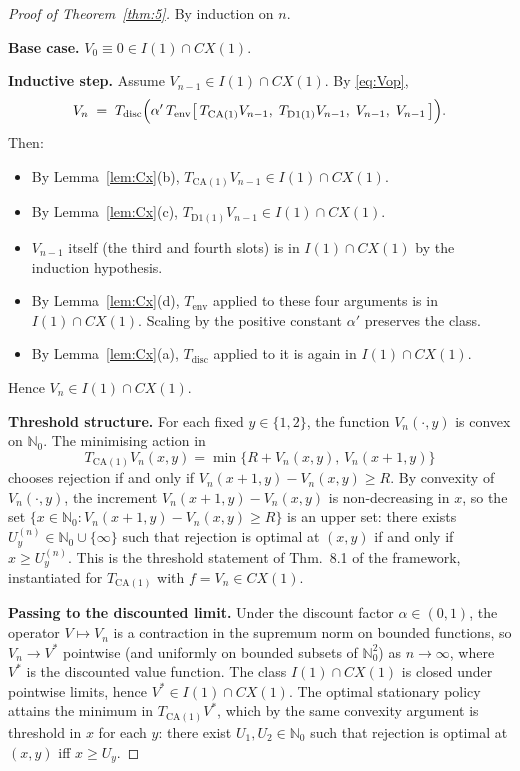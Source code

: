 \documentclass[11pt,a4paper]{article}
\newcommand{\N}{\mathbb{N}}
\newcommand{\Tdisc}{T_{\mathrm{disc}}}
\newcommand{\Tenv}{T_{\mathrm{env}}}
\newcommand{\Tca}{T_{\mathrm{CA}(1)}}
\newcommand{\Td}{T_{\mathrm{D1}(1)}}
\newcommand{\Cx}{CX}
\newcommand{\Iclass}{I}
\theoremstyle{definition}
\begin{document}
\begin{proof}[Proof of Theorem~\ref{thm:5}]
By induction on $n$.

\textbf{Base case.} $V_0 \equiv 0 \in \Iclass(1) \cap \Cx(1)$.

\textbf{Inductive step.} Assume $V_{n-1} \in \Iclass(1) \cap
\Cx(1)$. By \eqref{eq:Vop},
\[
    V_n \;=\; \Tdisc\Bigl(\alpha'\,
        \Tenv\bigl[\,\Tca V_{n-1},\; \Td V_{n-1},\; V_{n-1},\; V_{n-1}\,\bigr]\Bigr).
\]
Then:
\begin{itemize}[leftmargin=2em, itemsep=0pt]
    \item By Lemma~\ref{lem:Cx}(b), $\Tca V_{n-1} \in \Iclass(1)
        \cap \Cx(1)$.
    \item By Lemma~\ref{lem:Cx}(c), $\Td V_{n-1} \in \Iclass(1)
        \cap \Cx(1)$.
    \item $V_{n-1}$ itself (the third and fourth slots) is in
        $\Iclass(1) \cap \Cx(1)$ by the induction hypothesis.
    \item By Lemma~\ref{lem:Cx}(d), $\Tenv$ applied to these four
        arguments is in $\Iclass(1) \cap \Cx(1)$. Scaling by the
        positive constant $\alpha'$ preserves the class.
    \item By Lemma~\ref{lem:Cx}(a), $\Tdisc$ applied to it is
        again in $\Iclass(1) \cap \Cx(1)$.
\end{itemize}

Hence $V_n \in \Iclass(1) \cap \Cx(1)$.

\textbf{Threshold structure.} For each fixed $y \in \{1, 2\}$, the
function $V_n(\cdot, y)$ is convex on $\N_0$. The minimising action
in
\[
    \Tca V_n(x, y) = \min\{R + V_n(x, y),\, V_n(x + 1, y)\}
\]
chooses rejection if and only if $V_n(x + 1, y) - V_n(x, y) \ge R$.
By convexity of $V_n(\cdot, y)$, the increment $V_n(x + 1, y) -
V_n(x, y)$ is non-decreasing in $x$, so the set
$\{x \in \N_0 : V_n(x + 1, y) - V_n(x, y) \ge R\}$ is an upper set:
there exists $U_y^{(n)} \in \N_0 \cup \{\infty\}$ such that rejection
is optimal at $(x, y)$ if and only if $x \ge U_y^{(n)}$. This is the
threshold statement of Thm.~8.1 of the framework, instantiated for
$\Tca$ with $f = V_n \in \Cx(1)$.

\textbf{Passing to the discounted limit.} Under the discount factor
$\alpha \in (0, 1)$, the operator $V \mapsto V_n$ is a contraction
in the supremum norm on bounded functions, so $V_n \to V^*$
pointwise (and uniformly on bounded subsets of $\N_0^2$) as
$n \to \infty$, where $V^*$ is the discounted value function. The
class $\Iclass(1) \cap \Cx(1)$ is closed under pointwise limits,
hence $V^* \in \Iclass(1) \cap \Cx(1)$. The optimal stationary
policy attains the minimum in $\Tca V^*$, which by the same convexity
argument is threshold in $x$ for each $y$: there exist $U_1, U_2 \in
\N_0$ such that rejection is optimal at $(x, y)$ iff $x \ge U_y$.
\end{proof}
\end{document}
